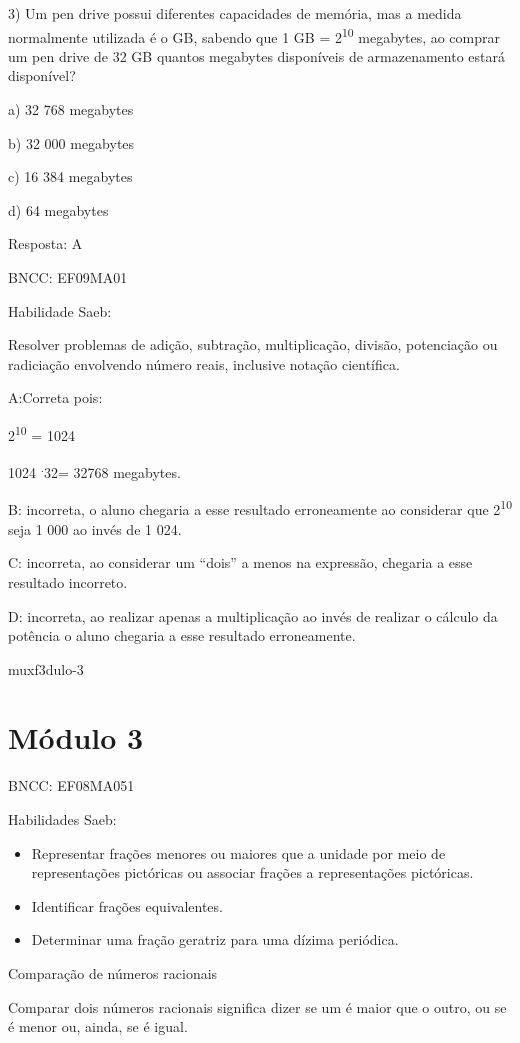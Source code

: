{3) Um pen drive possui diferentes capacidades de memória, mas a medida
normalmente utilizada é o GB, sabendo que 1 GB = 2\textsuperscript{10}
megabytes, ao comprar um pen drive de 32 GB quantos megabytes
disponíveis de armazenamento estará disponível?

a) 32 768 megabytes

b) 32 000 megabytes

c) 16 384 megabytes

d) 64 megabytes

Resposta: A

BNCC: EF09MA01

Habilidade Saeb:

Resolver problemas de adição, subtração, multiplicação, divisão,
potenciação ou radiciação envolvendo número reais, inclusive notação
científica.

A:Correta pois:

2\textsuperscript{10} = 1024

1024 \textsuperscript{.}32= 32768 megabytes.

B: incorreta, o aluno chegaria a esse resultado erroneamente ao
considerar que 2\textsuperscript{10} seja 1 000 ao invés de 1 024.

C: incorreta, ao considerar um ``dois'' a menos na expressão, chegaria a
esse resultado incorreto.

D: incorreta, ao realizar apenas a multiplicação ao invés de realizar o
cálculo da potência o aluno chegaria a esse resultado erroneamente.

muxf3dulo-3}{%
\section{Módulo 3}

BNCC: EF08MA051

Habilidades Saeb:

\begin{itemize}
\item
  Representar frações menores ou maiores que a unidade por meio de
  representações pictóricas ou associar frações a representações
  pictóricas.
\item
  Identificar frações equivalentes.
\item
  Determinar uma fração geratriz para uma dízima periódica.
\end{itemize}

Comparação de números racionais

Comparar dois números racionais significa dizer se um é maior que o
outro, ou se é menor ou, ainda, se é igual.

}

